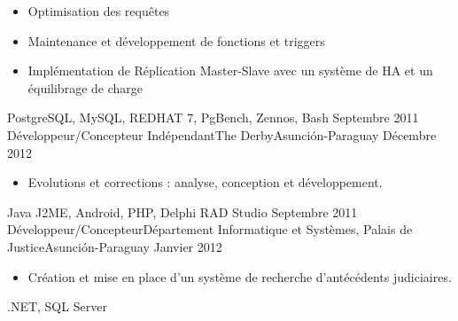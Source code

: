 \begin{experiences}
{\begin{itemize}
                        \item Optimisation des requêtes
                        \item Maintenance et développement de fonctions et triggers
                        \item Implémentation de Réplication Master-Slave avec un système de HA et un équilibrage de charge
                      \end{itemize}
				}
                {PostgreSQL, MySQL, REDHAT 7, PgBench, Zennos, Bash}
  \emptySeparator
  \experience
    {Septembre 2011}   {Développeur/Concepteur Indépendant}{The Derby}{Asunción-Paraguay}
    {Décembre 2012} {
                      \begin{itemize}
                        \item Evolutions et corrections : analyse, conception et développement.
                      \end{itemize}
				}
                {Java J2ME, Android, PHP, Delphi RAD Studio}
  \emptySeparator
  \experience
    {Septembre 2011}   {Développeur/Concepteur}{Département Informatique et Systèmes, Palais de Justice}{Asunción-Paraguay}
    {Janvier 2012} {
                      \begin{itemize}
                        \item Création et mise en place d’un système de recherche d’antécédents judiciaires.
                      \end{itemize}
				}
                {.NET, SQL Server}
  \emptySeparator
\end{experiences}
